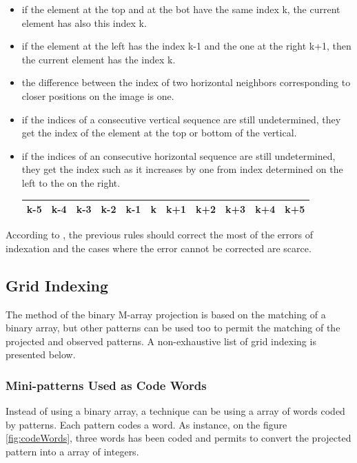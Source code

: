 \begin{itemize}
\item if the element at the top and at the bot have the same index k, the current element has also this index k.
\item if the element at the left has the index k-1 and the one at the right k+1, then the current element has the index k.
\item the difference between the index of two horizontal neighbors corresponding to closer positions on the image is one.
\item if the indices of a consecutive vertical sequence are still undetermined, they get the index of the element at the top or bottom of the vertical.

\item if the indices of an consecutive horizontal sequence are still undetermined, they get the index such as it increases by one from index determined on the left to the on the right.
\begin{tabular}{|*{11}{c|}}
    \hline
     k-5  & k-4  & k-3  & \textcolor[rgb]{1,0,0}{k-2}  & \textcolor[rgb]{1,0,0}{k-1}  & \textcolor[rgb]{1,0,0}{k}  & \textcolor[rgb]{1,0,0}{k+1}  & k+2  & k+3  & k+4 & k+5 \\
    \hline
\end{tabular}
\end{itemize}

According to \cite{morita1988reconstruction}, the previous rules should correct the most of the errors of indexation and the cases where the error cannot be corrected are scarce.







\subsection{Grid Indexing}

The method of the binary M-array projection is based on the matching of a binary array, but other patterns can be used too to permit the matching of the projected and observed patterns. A non-exhaustive list of grid indexing is presented below.

\subsubsection{Mini-patterns Used as Code Words}

Instead of using a binary array, a technique can be using a array of words coded by patterns. Each pattern codes a word. As instance, on the figure \ref{fig:codeWords}, three words has been coded and permits to convert the projected pattern into a array of integers.


